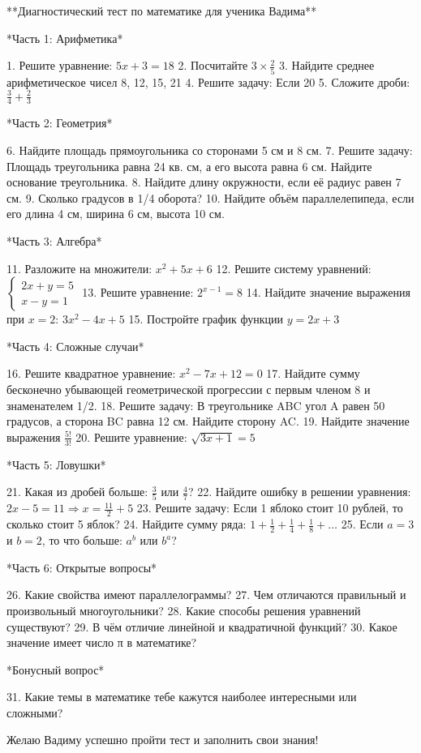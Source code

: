 \documentclass{article}
\begin{document}
**Диагностический тест по математике для ученика Вадима**

*Часть 1: Арифметика*

1. Решите уравнение: \(5x + 3 = 18\)
2. Посчитайте \(3 \times \frac{2}{5}\)
3. Найдите среднее арифметическое чисел 8, 12, 15, 21
4. Решите задачу: Если 20%
5. Сложите дроби: \(\frac{3}{4} + \frac{2}{3}\)

*Часть 2: Геометрия*

6. Найдите площадь прямоугольника со сторонами 5 см и 8 см.
7. Решите задачу: Площадь треугольника равна 24 кв. см, а его высота равна 6 см. Найдите основание треугольника.
8. Найдите длину окружности, если её радиус равен 7 см.
9. Сколько градусов в 1/4 оборота?
10. Найдите объём параллелепипеда, если его длина 4 см, ширина 6 см, высота 10 см.

*Часть 3: Алгебра*

11. Разложите на множители: \(x^2 + 5x + 6\)
12. Решите систему уравнений: \(\begin{cases} 2x + y = 5 \\ x - y = 1 \end{cases}\)
13. Решите уравнение: \(2^{x-1} = 8\)
14. Найдите значение выражения при \(x = 2\): \(3x^2 - 4x + 5\)
15. Постройте график функции \(y = 2x + 3\)

*Часть 4: Сложные случаи*

16. Решите квадратное уравнение: \(x^2 - 7x + 12 = 0\)
17. Найдите сумму бесконечно убывающей геометрической прогрессии с первым членом 8 и знаменателем 1/2.
18. Решите задачу: В треугольнике ABC угол A равен 50 градусов, а сторона BC равна 12 см. Найдите сторону AC.
19. Найдите значение выражения \(\frac{5!}{3!}\)
20. Решите уравнение: \(\sqrt{3x + 1} = 5\)

*Часть 5: Ловушки*

21. Какая из дробей больше: \(\frac{3}{5}\) или \(\frac{4}{7}\)?
22. Найдите ошибку в решении уравнения: \(2x - 5 = 11 \Rightarrow x = \frac{11}{2} + 5\)
23. Решите задачу: Если 1 яблоко стоит 10 рублей, то сколько стоит 5 яблок?
24. Найдите сумму ряда: \(1 + \frac{1}{2} + \frac{1}{4} + \frac{1}{8} + \ldots\)
25. Если \(a = 3\) и \(b = 2\), то что больше: \(a^b\) или \(b^a\)?

*Часть 6: Открытые вопросы*

26. Какие свойства имеют параллелограммы?
27. Чем отличаются правильный и произвольный многоугольники?
28. Какие способы решения уравнений существуют?
29. В чём отличие линейной и квадратичной функций?
30. Какое значение имеет число π в математике?

*Бонусный вопрос*

31. Какие темы в математике тебе кажутся наиболее интересными или сложными?

Желаю Вадиму успешно пройти тест и заполнить свои знания!
\end{document}
